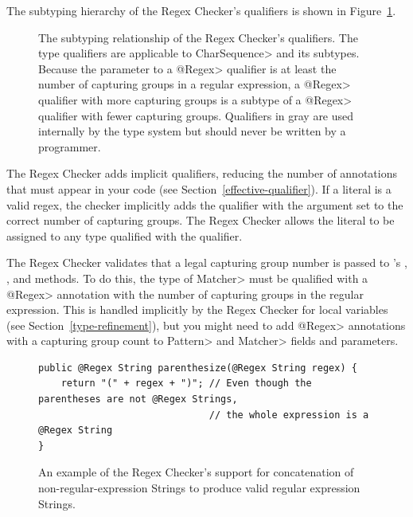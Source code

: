The subtyping hierarchy of the Regex Checker's qualifiers is shown in
Figure~\ref{fig-regex-hierarchy}.

\begin{figure}
\caption{The subtyping relationship of the Regex Checker's qualifiers.
  The type qualifiers are applicable to \<CharSequence> and its subtypes.
  Because the parameter to a \<@Regex> qualifier is at least the number of
  capturing groups in a regular expression, a \<@Regex> qualifier with more
  capturing groups is a subtype of a \<@Regex> qualifier with fewer capturing
  groups. Qualifiers in gray are used internally by the type
  system but should never be written by a programmer.}
\label{fig-regex-hierarchy}
\end{figure}




The Regex Checker adds
implicit qualifiers, reducing the number of annotations that must appear
in your code (see Section~\ref{effective-qualifier}).
If a  literal is a valid regex,
the checker implicitly adds the  qualifier with
the argument set to the correct number of capturing groups.
The Regex Checker allows
the  literal to be assigned to any type qualified with the
 qualifier.



The Regex Checker validates that a legal capturing group number is passed
to 's
,
, and
 methods. To do this,
the type of \<Matcher> must be qualified with a \<@Regex> annotation
with the number of capturing groups in the regular expression. This is
handled implicitly by the Regex Checker for local variables (see
Section~\ref{type-refinement}), but you might need to add \<@Regex> annotations
with a capturing group count to \<Pattern> and \<Matcher> fields and
parameters.



\begin{figure}
\begin{Verbatim}
public @Regex String parenthesize(@Regex String regex) {
    return "(" + regex + ")"; // Even though the parentheses are not @Regex Strings,
                              // the whole expression is a @Regex String
}
\end{Verbatim}
\caption{An example of the Regex Checker's support for concatenation
of non-regular-expression Strings to produce valid regular expression Strings.}
\label{fig-regex-partial}
\end{figure}


